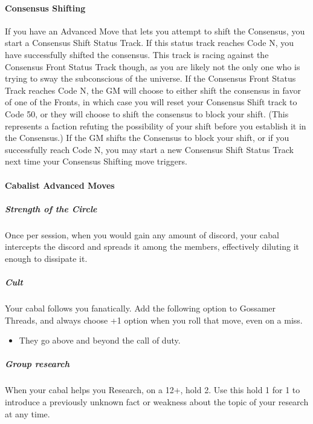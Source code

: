 \documentclass[
]{article}
\providecommand{\tightlist}{%
  \setlength{\itemsep}{0pt}\setlength{\parskip}{0pt}}
\begin{document}
\hypertarget{consensus-shifting}{%
\paragraph{Consensus Shifting}\label{consensus-shifting}}

If you have an Advanced Move that lets you attempt to shift the
Consensus, you start a Consensus Shift Status Track. If this status
track reaches Code N, you have successfully shifted the consensus. This
track is racing against the Consensus Front Status Track though, as you
are likely not the only one who is trying to sway the subconscious of
the universe. If the Consensus Front Status Track reaches Code N, the GM
will choose to either shift the consensus in favor of one of the Fronts,
in which case you will reset your Consensus Shift track to Code 50, or
they will choose to shift the consensus to block your shift. (This
represents a faction refuting the possibility of your shift before you
establish it in the Consensus.) If the GM shifts the Consensus to block
your shift, or if you successfully reach Code N, you may start a new
Consensus Shift Status Track next time your Consensus Shifting move
triggers.

\hypertarget{cabalist-advanced-moves}{%
\paragraph{Cabalist Advanced Moves}\label{cabalist-advanced-moves}}

\hypertarget{strength-of-the-circle}{%
\subparagraph{Strength of the Circle}\label{strength-of-the-circle}}

Once per session, when you would gain any amount of discord, your cabal
intercepts the discord and spreads it among the members, effectively
diluting it enough to dissipate it.

\hypertarget{cult}{%
\subparagraph{Cult}\label{cult}}

Your cabal follows you fanatically. Add the following option to Gossamer
Threads, and always choose +1 option when you roll that move, even on a
miss.

\begin{itemize}
\tightlist
\item
  They go above and beyond the call of duty.
\end{itemize}

\hypertarget{group-research}{%
\subparagraph{Group research}\label{group-research}}

When your cabal helps you Research, on a 12+, hold 2. Use this hold 1
for 1 to introduce a previously unknown fact or weakness about the topic
of your research at any time.
\end{document}

